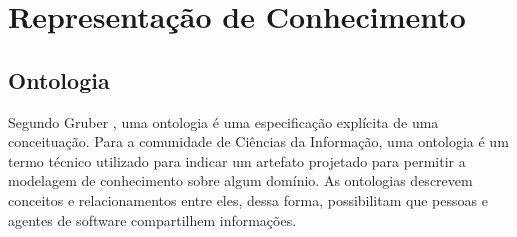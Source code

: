 \section{Representação de Conhecimento} %
\label{sec:representação_de_conhecimento}




\subsection{Ontologia} %
\label{ssub:ontologia}


Segundo Gruber \cite{gruber1993tap}, uma ontologia é uma especificação explícita de uma conceituação. Para a comunidade de Ciências da Informação, uma ontologia é um termo técnico utilizado para indicar um artefato projetado para permitir a modelagem de conhecimento sobre algum domínio\cite{gruber2008oed}. As ontologias descrevem conceitos e relacionamentos entre eles, dessa forma, possibilitam que pessoas e agentes de software compartilhem informações.




